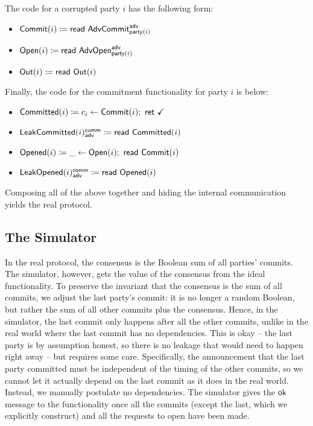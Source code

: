 The code for a corrupted party $i$ has the following form:
\begin{itemize}
\item {\color{blue} $\mathsf{Commit}(i) \coloneqq \mathsf{read} \ \mathsf{AdvCommit}^{\mathsf{adv}}_{\mathsf{party}(i)}$}
\item {\color{teal} $\mathsf{Open}(i) \coloneqq \mathsf{read} \ \mathsf{AdvOpen}^{\mathsf{adv}}_{\mathsf{party}(i)}$}
\item $\mathsf{Out}(i) \coloneqq \mathsf{read} \ \mathsf{Out}(i)$
\end{itemize}
Finally, the code for the commitment functionality for party $i$ is below:
\begin{itemize}
\item {\color{magenta} $\mathsf{Committed}(i) \coloneqq c_i \leftarrow \mathsf{Commit}(i); \ \mathsf{ret} \ \checkmark$}
\item {\color{magenta} $\mathsf{LeakCommitted}(i)^{\mathsf{comm}}_{\mathsf{adv}} \coloneqq \mathsf{read} \ \mathsf{Committed}(i)$}
\item {\color{red} $\mathsf{Opened}(i) \coloneqq \_ \leftarrow \mathsf{Open}(i); \ \mathsf{read} \ \mathsf{Commit}(i)$}
\item {\color{red} $\mathsf{LeakOpened}(i)^{\mathsf{comm}}_{\mathsf{adv}} \coloneqq \mathsf{read} \ \mathsf{Opened}(i)$}
\end{itemize}
Composing all of the above together and hiding the internal communication yields the real protocol.

\subsection{The Simulator}
In the real protocol, the consensus is the Boolean sum of all parties' commits. The simulator, however, gets the value of the consensus from the ideal functionality. To preserve the invariant that the consensus is the sum of all commits, we adjust the last party's commit: it is no longer a random Boolean, but rather the sum of all other commits plus the consensus. Hence, in the simulator, the last commit only happens after all the other commits, unlike in the real world where the last commit has no dependencies. This is okay -- the last party is by assumption honest, so there is no leakage that would need to happen right away -- but requires some care. Specifically, the announcement that the last party committed must be independent of the timing of the other commits, so we cannot let it actually depend on the last commit as it does in the real world. Instead, we manually postulate no dependencies. The simulator gives the $\mathsf{ok}$ message to the functionality once all the commits (except the last, which we explicitly construct) and all the requests to open have been made.

